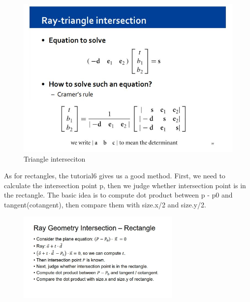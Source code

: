\documentclass[acmtog]{acmart}
\begin{document}
\begin{figure}[h]
{\begin{minipage}[b]{.4\linewidth}
            \includegraphics[scale=0.25]{t3.JPG}
        \end{minipage}
    }
    \caption{Triangle interseciton}
\end{figure}

As for rectangles, the tutorial6 gives us a good method. 
First, we need to calculate the intersection point p, then we judge whether intersection point is in the rectangle. The basic idea is to 
compute dot product between p - p0 and tangent(cotangent), then compare them with size.x/2 and size.y/2.



\begin{figure}[h]
	\centering
	{\includegraphics[width=8cm]{r1.JPG}}	
\end{figure}
\end{document}
